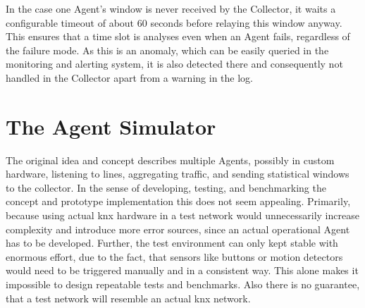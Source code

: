 In the case one Agent's window is never received by the Collector, it waits a configurable timeout of about $60$ seconds before relaying this window anyway. This ensures that a time slot is analyses even when an Agent fails, regardless of the failure mode. As this is an anomaly, which can be easily queried in the monitoring and alerting system, it is also detected there and consequently not handled in the Collector apart from a warning in the log.

\section{The Agent Simulator}
\label{sec:impl:agent}

\begin{comment}
\begin{itemize}
	\item simulates multiple agents based of one log containing telegram in raw \gls{baos} format. cf. Appendix~\todo{add log sample in appendix}
	\item log must be in chronological order
	\item utilizes own parser implementation \url{https://github.com/FreakyBytes/BaosKnxParser}
	\item different agents can be simulated by applying filter rules to log stream, defining, what each agent "can see"
	\item is supposed to replace actual agents during development
		\subitem repeatable data
		\subitem easy/fast setup
		\subitem log-time much faster than real-time
		\subitem load testing possible
	\item reads in individual pack
	\item filters according to agent filter rules
	\item updates agent-specific window data model
	\item if window length/timeout (cf. Section~\ref{sec:concept:agent}) is exceeded in log-time, windows are submitted to \gls{amqp} message broker (cf. Figure~\ref{fig:concept:architecture})
	\item runs until log is fully red, or maximum packets to parse are exceeded, or defined end timestamp is reached
\end{itemize}
\end{comment}

The original idea and concept describes multiple Agents, possibly in custom hardware, listening to lines, aggregating traffic, and sending statistical windows to the collector.
In the sense of developing, testing, and benchmarking the concept and prototype implementation this does not seem appealing. Primarily, because using actual \gls{knx} hardware in a test network would unnecessarily increase complexity and introduce more error sources, since an actual operational Agent has to be developed.
Further, the test environment can only kept stable with enormous effort, due to the fact, that sensors like buttons or motion detectors would need to be triggered manually and in a consistent way. This alone makes it impossible to design repeatable tests and benchmarks.
Also there is no guarantee, that a test network will resemble an actual \gls{knx} network.

